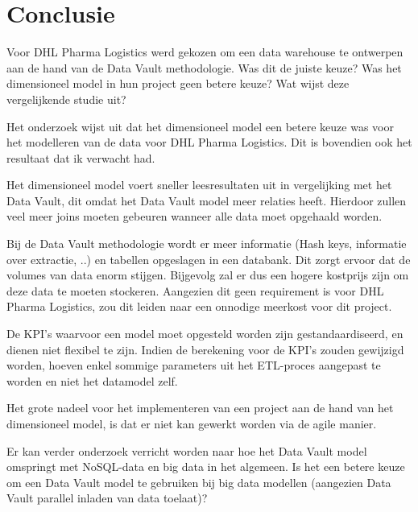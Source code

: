 
\chapter{Conclusie}
\label{ch:conclusie}


Voor DHL Pharma Logistics werd gekozen om een data warehouse te ontwerpen aan de hand van de Data Vault methodologie. Was dit de juiste keuze? Was het dimensioneel model in hun project geen betere keuze? Wat wijst deze vergelijkende studie uit?

Het onderzoek wijst uit dat het dimensioneel model een betere keuze was voor het modelleren van de data voor DHL Pharma Logistics. Dit is bovendien ook het resultaat dat ik verwacht had.

Het dimensioneel model voert sneller leesresultaten uit in vergelijking met het Data Vault, dit omdat het Data Vault model meer relaties heeft. Hierdoor zullen veel meer joins moeten gebeuren wanneer alle data moet opgehaald worden. 

Bij de Data Vault methodologie wordt er meer informatie (Hash keys, informatie over extractie, ..) en tabellen opgeslagen in een databank. Dit zorgt ervoor dat de volumes van data enorm stijgen. Bijgevolg zal er dus een hogere kostprijs zijn om deze data te moeten stockeren. Aangezien dit geen requirement is voor DHL Pharma Logistics, zou dit leiden naar een onnodige meerkost voor dit project.

De KPI's waarvoor een model moet opgesteld worden zijn gestandaardiseerd, en dienen niet flexibel te zijn. Indien de berekening voor de KPI's zouden gewijzigd worden, hoeven enkel sommige parameters uit het ETL-proces aangepast te worden en niet het datamodel zelf.

Het grote nadeel voor het implementeren van een project aan de hand van het dimensioneel model, is dat er niet kan gewerkt worden via de agile manier.

Er kan verder onderzoek verricht worden naar hoe het Data Vault model omspringt met NoSQL-data en big data in het algemeen. Is het een betere keuze om een Data Vault model te gebruiken bij big data modellen (aangezien Data Vault parallel inladen van data toelaat)? 